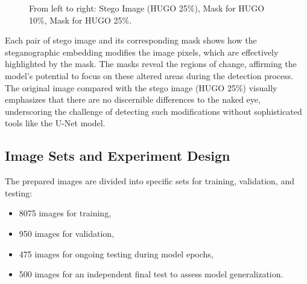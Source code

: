 \documentclass[12pt,a4paper]{article}
\begin{document}
\begin{figure}[ht]
    \centering
    \caption{From left to right: Stego Image (HUGO 25\%), Mask for HUGO 10\%, Mask for HUGO 25\%.}
\end{figure}

Each pair of stego image and its corresponding mask shows how the steganographic embedding modifies the image pixels, which are effectively highlighted by the mask. The masks reveal the regions of change, affirming the model's potential to focus on these altered areas during the detection process. The original image compared with the stego image (HUGO 25\%) visually emphasizes that there are no discernible differences to the naked eye, underscoring the challenge of detecting such modifications without sophisticated tools like the U-Net model.


\subsection{Image Sets and Experiment Design}
The prepared images are divided into specific sets for training, validation, and testing:
\begin{itemize}
    \item 8075 images for training,
    \item 950 images for validation,
    \item 475 images for ongoing testing during model epochs,
    \item 500 images for an independent final test to assess model generalization.
\end{itemize}
\end{document}
